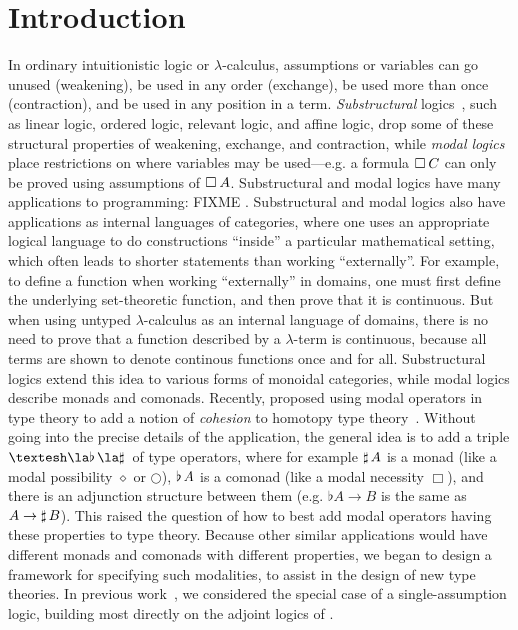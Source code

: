 
\section{Introduction}

In ordinary intuitionistic logic or $\lambda$-calculus, assumptions or
variables can go unused (weakening), be used in any order (exchange), be
used more than once (contraction), and be used in any position in a
term.  \emph{Substructural} logics~\citep{?}, such as linear logic,
ordered logic, relevant logic, and affine logic, drop some of these
structural properties of weakening, exchange, and contraction, while
\emph{modal logics}~\citep{?} place restrictions on where variables may
be used---e.g. a formula $\Box_{} \, {C}$ can only be proved using assumptions
of $\Box_{} \, {A}$.  Substructural and modal logics have many applications to
programming: FIXME \citep{?}.  Substructural and modal logics also have
applications as internal languages of categories, where one uses an
appropriate logical language to do constructions ``inside'' a particular
mathematical setting, which often leads to shorter statements than
working ``externally''.  For example, to define a function when working
``externally'' in domains, one must first define the underlying
set-theoretic function, and then prove that it is continuous.  But when
using untyped $\lambda$-calculus as an internal language of domains,
there is no need to prove that a function described by a $\lambda$-term
is continuous, because all terms are shown to denote continous functions
once and for all.  Substructural logics extend this idea to various
forms of monoidal categories, while modal logics describe monads and
comonads.  Recently,
\citet{schreibershulman12cohesive,shulman15realcohesion} proposed using
modal operators in type theory to add a notion of \emph{cohesion} to
homotopy type theory~\citep{uf13hott-book,voevodsky06homotopy}.  Without
going into the precise details of the application, the general idea is
to add a triple $\sh{} \la \Flat{} \la \Sharp{}$ of type operators,
where for example $\sharp \, {A}$ is a monad (like a modal possibility
$\diamond$ or $\bigcirc$), $\flat \, {A}$ is a comonad (like a modal
necessity $\Box$), and there is an adjunction structure between them
(e.g. $\flat{A} \to B$ is the same as $A \to \sharp \, {B}$).  This raised
the question of how to best add modal operators having these properties
to type theory.  Because other similar applications would have different
monads and comonads with different properties, we began to design a
framework for specifying such modalities, to assist in the design of new
type theories.  In previous work~\citep{ls16adjoint}, we considered the
special case of a single-assumption logic, building most directly on the
adjoint logics of \citet{bentonwadler96adjoint,reed09adjoint}.

